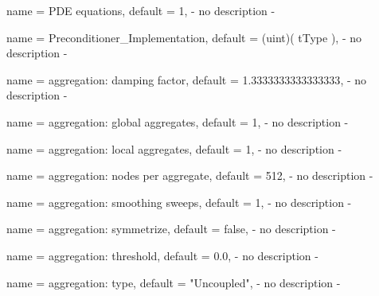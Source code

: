 \begin{parameter}{
    name    = {PDE equations},
    default = {1},
}
- no description -
\end{parameter}

\begin{parameter}{
    name    = {Preconditioner_Implementation},
    default = {(uint)( tType )},
}
- no description -
\end{parameter}

\begin{parameter}{
    name    = {aggregation: damping factor},
    default = {1.3333333333333333},
}
- no description -
\end{parameter}

\begin{parameter}{
    name    = {aggregation: global aggregates},
    default = {1},
}
- no description -
\end{parameter}

\begin{parameter}{
    name    = {aggregation: local aggregates},
    default = {1},
}
- no description -
\end{parameter}

\begin{parameter}{
    name    = {aggregation: nodes per aggregate},
    default = {512},
}
- no description -
\end{parameter}

\begin{parameter}{
    name    = {aggregation: smoothing sweeps},
    default = {1},
}
- no description -
\end{parameter}

\begin{parameter}{
    name    = {aggregation: symmetrize},
    default = {false},
}
- no description -
\end{parameter}

\begin{parameter}{
    name    = {aggregation: threshold},
    default = {0.0},
}
- no description -
\end{parameter}

\begin{parameter}{
    name    = {aggregation: type},
    default = {"Uncoupled"},
}
- no description -
\end{parameter}


